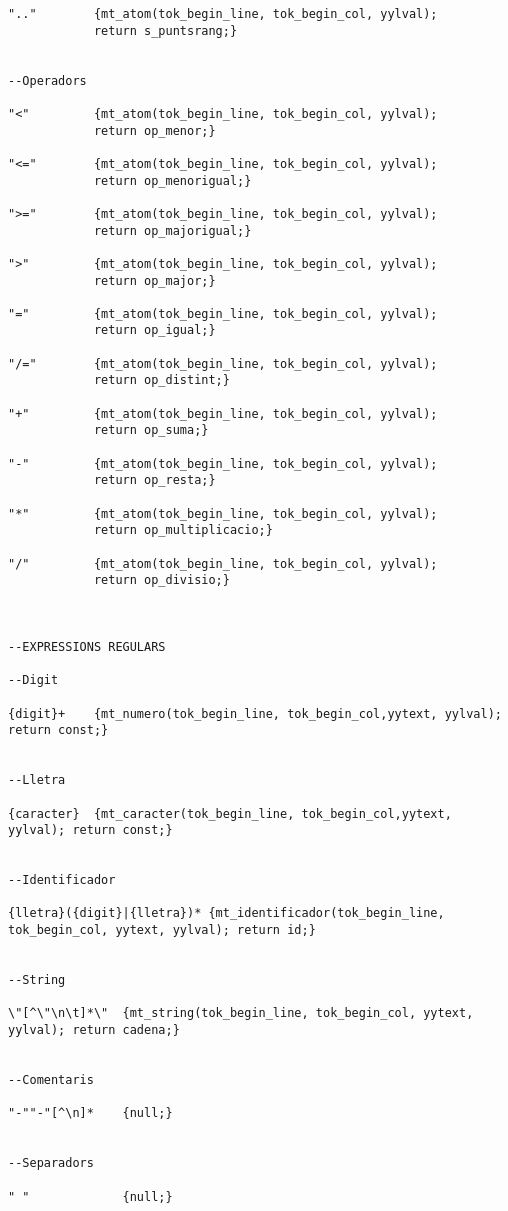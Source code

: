 \documentclass[10pt]{report}
\begin{document}
\begin{lstlisting}[style=Ada]
".."        {mt_atom(tok_begin_line, tok_begin_col, yylval); 
            return s_puntsrang;}


--Operadors

"<"         {mt_atom(tok_begin_line, tok_begin_col, yylval); 
            return op_menor;}

"<="        {mt_atom(tok_begin_line, tok_begin_col, yylval);
            return op_menorigual;}

">="        {mt_atom(tok_begin_line, tok_begin_col, yylval);
            return op_majorigual;}

">"         {mt_atom(tok_begin_line, tok_begin_col, yylval); 
            return op_major;}

"="         {mt_atom(tok_begin_line, tok_begin_col, yylval); 
            return op_igual;}

"/="        {mt_atom(tok_begin_line, tok_begin_col, yylval); 
            return op_distint;}

"+"         {mt_atom(tok_begin_line, tok_begin_col, yylval); 
            return op_suma;}

"-"         {mt_atom(tok_begin_line, tok_begin_col, yylval); 
            return op_resta;}

"*"         {mt_atom(tok_begin_line, tok_begin_col, yylval);
            return op_multiplicacio;}

"/"         {mt_atom(tok_begin_line, tok_begin_col, yylval); 
            return op_divisio;}



--EXPRESSIONS REGULARS

--Digit

{digit}+    {mt_numero(tok_begin_line, tok_begin_col,yytext, yylval); return const;}
            
            
--Lletra

{caracter}  {mt_caracter(tok_begin_line, tok_begin_col,yytext, yylval); return const;}
            

--Identificador

{lletra}({digit}|{lletra})* {mt_identificador(tok_begin_line, tok_begin_col, yytext, yylval); return id;}


--String

\"[^\"\n\t]*\"  {mt_string(tok_begin_line, tok_begin_col, yytext, yylval); return cadena;}


--Comentaris

"-""-"[^\n]*    {null;}


--Separadors

" "             {null;}


\end{lstlisting}
\end{document}
